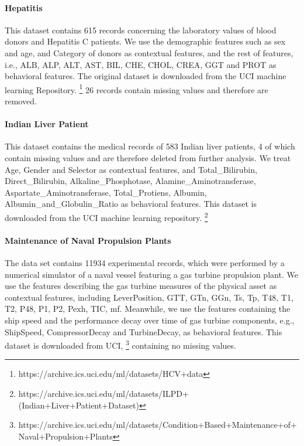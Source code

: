 \documentclass[pdflatex,sn-basic]{sn-jnl}%
\theoremstyle{thmstyleone}%
\theoremstyle{thmstyletwo}%
\theoremstyle{thmstylethree}%
\begin{document}
\begin{appendices}
\paragraph{Hepatitis}
This dataset contains 615 records concerning the laboratory values of blood donors and Hepatitis C patients. We use the demographic features such as sex and age, and Category of donors as contextual features, and the rest of features, i.e., ALB, ALP, ALT, AST, BIL, CHE, CHOL, CREA, GGT and PROT as behavioral features. The original dataset is downloaded from the UCI machine learning Repository. \footnote{ https://archive.ics.uci.edu/ml/datasets/HCV+data} 26 records contain missing values and therefore are removed.

\paragraph{Indian Liver Patient} 
This dataset contains the medical records of 583 Indian liver patients, 4 of which contain missing values and are therefore deleted from further analysis. We treat Age, Gender and Selector as contextual features, and Total\_Bilirubin, Direct\_Bilirubin, Alkaline\_Phosphotase, Alamine\_Aminotransferase, Aspartate\_Aminotransferase, Total\_Protiens, Albumin, Albumin\_and\_Globulin\_Ratio as behavioral features. This dataset is downloaded from the UCI machine learning repository. \footnote{https://archive.ics.uci.edu/ml/datasets/ILPD+(Indian+Liver+Patient+Dataset)}

\paragraph{Maintenance of Naval Propulsion Plants } The data set contains 11934 experimental records, which were performed by a numerical simulator of a naval vessel featuring a gas turbine propulsion plant. We use the features describing the gas turbine measures of the physical asset as contextual features, including LeverPosition, GTT, GTn, GGn, Ts, Tp, T48, T1, T2, P48, P1, P2, Pexh, TIC, mf. Meanwhile, we use the features containing the ship speed and the performance decay over time of gas turbine components, e.g., ShipSpeed, CompressorDecay and TurbineDecay, as behavioral features. This dataset is downloaded from UCI, \footnote{https://archive.ics.uci.edu/ml/datasets/Condition+Based+Maintenance+of+Naval+Propulsion+Plants} containing no missing values.


\end{appendices}
\end{document}
